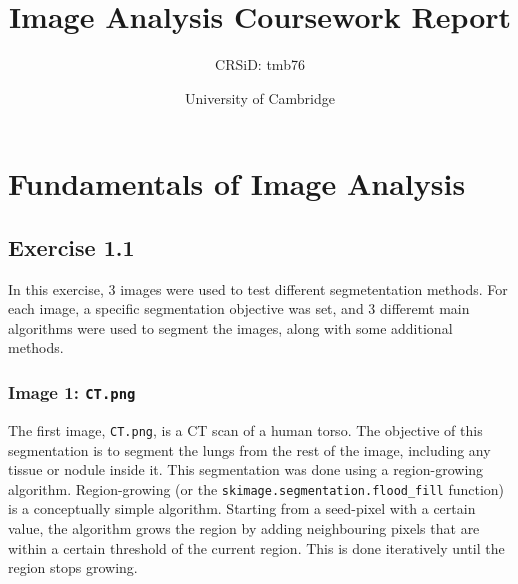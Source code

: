 \documentclass[12pt]{report} %
\title{Image Analysis Coursework Report}
\author{CRSiD: tmb76}
\date{University of Cambridge}
\begin{document}
\maketitle

\tableofcontents

\chapter*{}

\chapter{Fundamentals of Image Analysis}

\section{Exercise 1.1}

In this exercise, 3 images were used to test different segmetentation methods. For each image, a specific segmentation objective was set, and 3 differemt main algorithms were used to segment the images, along with some additional methods.

\subsection{Image 1: \texttt{CT.png}}

The first image, \texttt{CT.png}, is a CT scan of a human torso. The objective of this segmentation is to segment the lungs from the rest of the image, including any tissue or nodule inside it. This segmentation was done using a region-growing algorithm. Region-growing (or the \texttt{skimage.segmentation.flood\_fill} function) is a conceptually simple algorithm. Starting from a seed-pixel with a certain value, the algorithm grows the region by adding neighbouring pixels that are within a certain threshold of the current region. This is done iteratively until the region stops growing\cite{skimage_flood_fill}\cite[pp.764-766]{gonzalez2002digital}.
\end{document}
